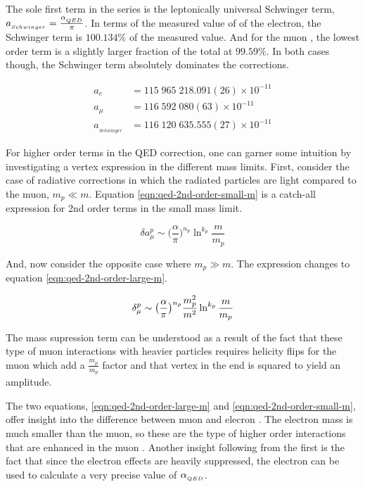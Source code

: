 \noindent
The sole first term in the series is the leptonically universal Schwinger term, $a_{_{Schwinger}} = \frac{\alpha_{_{QED}}}{\pi}$.  In terms of the measured value of \gmtwo of the electron, the Schwinger term is $100.134\%$ of the measured value. And for the muon \gmtwo, the lowest order term is a slightly larger fraction of the total at $99.59\%$\cite{codata}.  In both cases though, the Schwinger term absolutely dominates the corrections.

\begin{align*}
a_{e}   & = 115\;965\;218.091(26) \times 10^{-11} \\
a_{\mu} & = 116\;592\;080(63) \times 10^{-11} \\
a_{_{Schwinger}} & = 116\;120\;635.555(27) \times 10^{-11}
\end{align*}

For higher order terms in the QED correction, one can garner some intuition by investigating a vertex expression in the different mass limits.  First, consider the case of radiative corrections in which the radiated particles are light compared to the muon, $m_p \ll m$.  Equation \ref{eqn:qed-2nd-order-small-m} is a catch-all expression for 2nd order terms in the small mass limit\cite{the-muon-g-2}.

\begin{equation}
\label{eqn:qed-2nd-order-small-m}
\delta a_\mu^p \sim \big(\frac{\alpha}{\pi} \big)^{n_p} \ln^{k_p}\frac{m}{m_p}
\end{equation}

\noindent
And, now consider the opposite case where $m_p \gg m$.  The expression changes to equation \ref{eqn:qed-2nd-order-large-m}.

\begin{equation}
\label{eqn:qed-2nd-order-large-m}
\delta_\mu^p \sim \big(\frac{\alpha}{\pi} \big)^{n_p} \\
\frac{m_p^2}{m^2} \ln^{k_p}\frac{m}{m_p}
\end{equation}

\noindent
The mass supression term can be understood as a result of the fact that these type of muon interactions with heavier particles requires helicity flips for the muon which add a $\frac{m_\mu}{m_p}$ factor and that vertex in the end is squared to yield an amplitude\cite{amm-of-muon}.

The two equations, \ref{eqn:qed-2nd-order-large-m} and \ref{eqn:qed-2nd-order-small-m}, offer insight into the difference between muon and elecron \gmtwo.  The electron mass is much smaller than the muon, so these are the type of higher order interactions that are enhanced in the muon \gmtwo.  Another insight following from the first is the fact that since the electron effects are heavily suppressed, the electron \gmtwo can be used to calculate a very precise value of $\alpha_{_{QED}}$\cite{amm-of-muon}.

